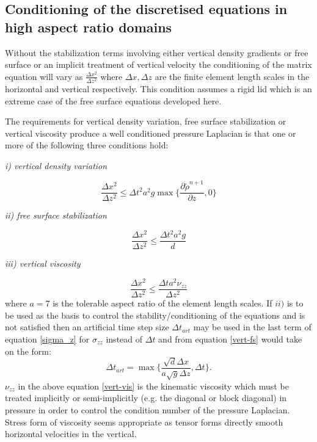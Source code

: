 \subsection{Conditioning of the discretised equations in 
high aspect ratio domains} 
\noindent 
Without the stabilization terms involving either 
vertical density gradients or free surface or an implicit treatment 
of vertical velocity the conditioning of the matrix equation 
will vary as $\frac{\Delta x^2}{\Delta z^2}$ where 
${\Delta x}, {\Delta z}$ are the finite element length scales 
in the horizontal and vertical respectively. This condition 
assumes a rigid lid which is an extreme case of the free surface equations 
developed here. 

The requirements for vertical density variation, free surface stabilization 
or vertical viscosity produce a well conditioned  
pressure Laplacian is that one or more of the following three 
conditions hold:


\noindent 
{\it i) vertical density variation}

\begin{equation}
\frac{\Delta x^2}{\Delta z^2} \leq \Delta t^2 a^2 g 
\max\{\frac{\partial \tilde \rho^{n+1}}{\partial z}, 0\} 
\label{vert-den}
\end{equation}

\noindent 
{\it ii) free surface stabilization}

\begin{equation}
\frac{\Delta x^2}{\Delta z^2} \leq \frac{ \Delta t^2 a^2 g }{d} 
\label{vert-fs}
\end{equation}

\noindent 
{\it iii) vertical viscosity}

\begin{equation}
\frac{\Delta x^2}{\Delta z^2} \leq \frac{ \Delta t a^2 \nu_{zz} }{\Delta z^2} 
\label{vert-vis}
\end{equation}
where $a=7$ is the tolerable aspect ratio of the element length scales. 
If $ii)$ is to be used as the basis to control the stability/conditioning 
of the equations and is not satisfied then an artificial time step size $\Delta t_{art}$ 
may be used in the last term of 
equation \ref{sigma_z} for $\sigma_{zz}$ instead of $\Delta t$ and from 
equation \ref{vert-fs} would take on the form:
\begin{equation}
\Delta t_{art} = \max\{ \frac{\sqrt{d}\Delta x}{a \sqrt{g} \Delta z}, \Delta t \}. 
\label{vert-fs-art}
\end{equation}
$\nu_{zz}$ in the above equation \ref{vert-vis} is the kinematic viscosity which must be treated implicitly 
or semi-implicitly (e.g. the diagonal or block diagonal) 
in pressure in order to control the condition 
number of the pressure Laplacian. Stress form of viscosity seems 
appropriate as tensor forms directly smooth horizontal velocities 
in the vertical. 

